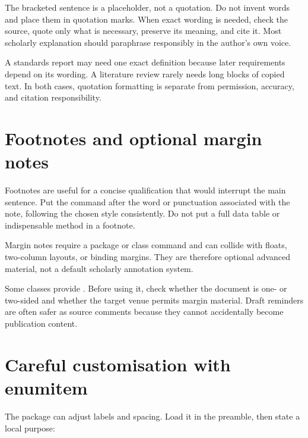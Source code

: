 The bracketed sentence is a placeholder, not a quotation. Do not invent words
and place them in quotation marks. When exact wording is needed, check the
source, quote only what is necessary, preserve its meaning, and cite it. Most
scholarly explanation should paraphrase responsibly in the author's own voice.

\begin{scienceinpractice}
A standards report may need one exact definition because later requirements
depend on its wording. A literature review rarely needs long blocks of copied
text. In both cases, quotation formatting is separate from permission,
accuracy, and citation responsibility.
\end{scienceinpractice}

\section{Footnotes and optional margin notes}

Footnotes are useful for a concise qualification that would interrupt the
main sentence. Put the command after the word or punctuation associated with
the note, following the chosen style consistently. Do not put a full data table
or indispensable method in a footnote.

Margin notes require a package or class command and can collide with floats,
two-column layouts, or binding margins. They are therefore optional advanced
material, not a default scholarly annotation system.

\begin{advancedtopic}
Some classes provide . Before using it, check
whether the document is one- or two-sided and whether the target venue permits
margin material. Draft reminders are often safer as source comments because
they cannot accidentally become publication content.
\end{advancedtopic}

\section{Careful customisation with enumitem}

The  package can adjust labels and spacing. Load it in the
preamble, then state a local purpose:


